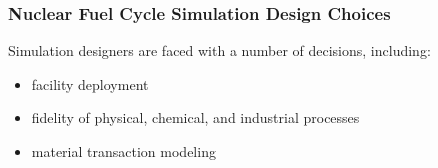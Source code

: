 \begin{frame}[ctb!]
  \frametitle{Nuclear Fuel Cycle Simulation Design Choices}
  Simulation designers are faced with a number of decisions, including:
  \begin{itemize}
    \item facility deployment
    \item fidelity of physical, chemical, and industrial processes
    \item material transaction modeling
  \end{itemize}
\end{frame}
